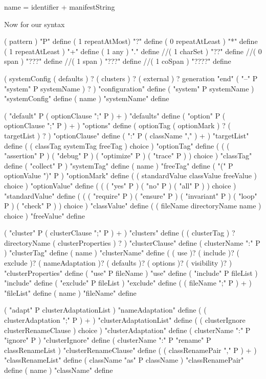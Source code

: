 name = identifier + manifestString
\stoptyping

Now for our syntax

\startJoylol
( pattern ) "P" define
( 1 repeatAtMost) "?" define
( 0 repeatAtLeast ) "*" define
( 1 repeatAtLeast ) "+" define
( 1 any ) "." define
//( 1 charSet ) "??" define
//( 0 span ) "???" define
//( 1 span ) "???" define
//( 1 coSpan ) "????" define
\stopJoylol

\startJoylol
(
  systemConfig
  ( defaults ) ?
  ( clusters ) ?
  ( external ) ?
  generation
  "end" ( "--" P "system" P systemName ) ?
) "configuration" define
( "system" P systemName ) "systemConfig" define
( name ) "systemName" define

( "default" P ( optionClause ";" P ) + ) "defaults" define
( "option"  P ( optionClause ";" P ) + ) "options" define
( 
  optionTag 
  ( optionMark ) ? 
  ( targetList ) ?
) "optionClause" define
( ":" P ( className "," ) + ) "targetList" define
( ( classTag systemTag freeTag ) choice ) "optionTag" define
(
  ( 
    ( "assertion" P )
    ( "debug" P )
    ( "optimize" P )
    ( "trace" P )
  ) choice
) "classTag" define
( "collect" P ) "systemTag" define
( name ) "freeTag" define
( "(" P optionValue ")" P ) "optionMark" define
( ( standardValue classValue freeValue ) choice ) "optionValue" define
(
  ( 
    ( "yes" P )
    ( "no" P )
    ( "all" P )
  ) choice
) "standardValue" define
(
  ( 
    ( "require" P )
    ( "ensure" P )
    ( "invariant" P )
    ( "loop" P )
    ( "check" P )
  ) choice
) "classValue" define
( ( fileName directoryName name ) choice ) "freeValue" define

( "cluster" P ( clusterClause ";" P ) + ) "clusters" define
( 
  ( clusterTag ) ?
  directoryName 
  ( clusterProperties ) ?
) "clusterClause" define
( clusterName ":" P ) "clusterTag" define
( name ) "clusterName" define
(
  ( use )?
  ( include )?
  ( exclude )?
  ( nameAdaptation )?
  ( defaults )?
  ( options )?
  ( visibility )?
) "clusterProperties" define
( "use" P fileName ) "use" define
( "include" P fileList ) "include" define
( "exclude" P fileList ) "exclude" define
( ( fileName ";" P ) + ) "fileList" define
( name ) "fileName" define

( "adapt" P clusterAdaptationList ) "nameAdaptation" define
( ( clusterAdaptation ";" P ) + ) "clusterAdaptationList" define
( ( clusterIgnore clusterRenameClause ) choice ) "clusterAdaptation" define
( clusterName ":" P "ignore" P ) "clusterIgnore" define
( clusterName ":" P "rename" P classRenameList ) "clusterRenameClause" define
( ( classRenamePair "," P ) + ) "classRenameList" define
( className "as" P className ) "classRenamePair" define
( name ) "className" define

